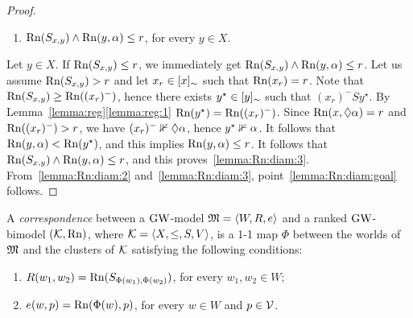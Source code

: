 \begin{proof}
 \begin{enumerate}[label=(\alph*), ref=(\alph*),leftmargin=*,start=6]
 \item\label{lemma:Rn:diam:3}
 $\mathrm{Rn}(S_{x,y})\land \mathrm{Rn}(y,\alpha)\leq  r$, for every $y\in X$.
 \end{enumerate}
 Let $y\in X$. If   $\mathrm{Rn}(S_{x,y}) \leq r$, we immediately get  
 $\mathrm{Rn}(S_{x,y})\land \mathrm{Rn}(y,\alpha) \leq r$.
 Let us assume  $\mathrm{Rn}(S_{x,y}) > r$
 and let $x_r\in [x]_\sim$ such that $\mathrm{Rn}(x_r) = r$.
 Note that  $\mathrm{Rn}(S_{x,y})\geq  \mathrm{Rn}((x_r)^-)$,
 hence  there exists $y^\star\in [y]_\sim$ such that  $(x_r)^- S y^\star$.
 By Lemma~\ref{lemma:reg}\ref{lemma:reg:1}  $\mathrm{Rn}(y^\star)= \mathrm{Rn}((x_r)^-)$.
 Since $\mathrm{Rn}(x,\lozenge \alpha)=r$ and $\mathrm{Rn}((x_r)^-) > r$, we have $(x_r)^-\nVdash \lozenge \alpha$,
 hence  $y^\star\nVdash \alpha$.
 It follows that  $\mathrm{Rn}(y,\alpha)< \mathrm{Rn}(y^\star)$, and this implies   $\mathrm{Rn}(y,\alpha)\leq r$.
 It follows that  $\mathrm{Rn}(S_{x,y})\land \mathrm{Rn}(y,\alpha)\leq  r$,
and this proves~\ref{lemma:Rn:diam:3}. From~\ref{lemma:Rn:diam:2} and~\ref{lemma:Rn:diam:3}, point~\ref{lemma:Rn:diam:goal} follows.

\end{proof}


  
\noindent
A \emph{correspondence} between a  $\mbox{$\mathrm{GW}$}$-model $\mathfrak{M}=\langle W,R,e \rangle$ and a ranked
$\mbox{$\mathrm{GW}$}$-bimodel $(\mathcal{K},\mathrm{Rn})$, where $\mathcal{K}=\langle X,\leq,S,V \rangle$, is a 1-1 map
$\Phi$ between the worlds of $\mathfrak{M}$ and the clusters of $\mathcal{K}$ satisfying
the following conditions:






  \begin{enumerate}[label=(C\arabic*), ref=(C\arabic*),leftmargin=*]

  \item\label{corr:1}
    $R(w_1, w_2)=\mathrm{Rn}( S_{\Phi(w_1),\Phi(w_2)}  )$, for every
  $w_1,w_2\in W$;

\item\label{corr:2}
  $e(w,p) =\mathrm{Rn}(\Phi(w),p)$, for every $w\in W$ and $p\in\mathcal{V}$.
\end{enumerate}
 



